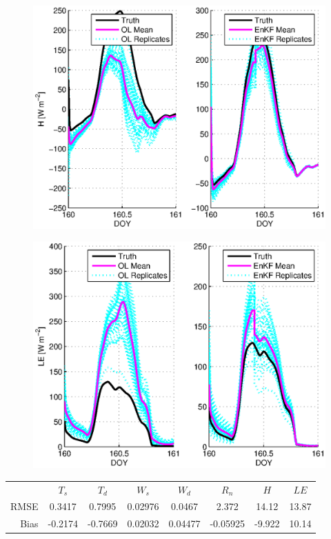 \documentclass[letterpaper]{tufte-handout}
\begin{document}
\begin{figure}
  \includegraphics[width=\textwidth]{3ch}
  \caption{}
\end{figure}
\begin{figure}
  \includegraphics[width=\textwidth]{3cle}
  \caption{}
\end{figure}
\begin{table}
  \begin{tabular}{rccccccc} 
    &$T_s$ & $T_d$ & $W_s$ & $W_d$ & $R_n$ & $H$ & $LE$ \\
    RMSE & 0.3417 & 0.7995 & 0.02976 & 0.0467 & 2.372 & 14.12 & 13.87\\
    Bias & -0.2174 & -0.7669 & 0.02032 & 0.04477 & -0.05925 & -9.922 & 10.14
  \end{tabular}
\end{table}
\end{document}
